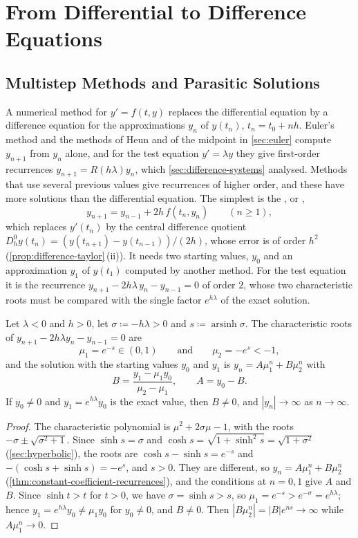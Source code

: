 \section{From Differential to Difference Equations}
\label{sec:ode-to-difference}

\subsection{Multistep Methods and Parasitic Solutions}

A numerical method for $y'=f(t,y)$ replaces the differential equation by a difference equation for the approximations $y_n$ of $y(t_n)$, $t_n=t_0+nh$. Euler's method and the methods of Heun and of the midpoint in \cref{sec:euler} compute $y_{n+1}$ from $y_n$ alone, and for the test equation $y'=\lambda y$ they give first-order recurrences $y_{n+1}=R(h\lambda)y_n$, which \cref{sec:difference-systems} analysed. Methods that use several previous values give recurrences of higher order, and these have more solutions than the differential equation. The simplest is the , or ,
\begin{equation}
y_{n+1}=y_{n-1}+2h\,f(t_n,y_n)\qquad(n\ge1),
\label{eq:leapfrog}
\end{equation}
which replaces $y'(t_n)$ by the central difference quotient $D_h^0y(t_n)=(y(t_{n+1})-y(t_{n-1}))/(2h)$, whose error is of order $h^2$ (\cref{prop:difference-taylor}\,(ii)). It needs two starting values, $y_0$ and an approximation $y_1$ of $y(t_1)$ computed by another method. For the test equation it is the recurrence $y_{n+1}-2h\lambda\,y_n-y_{n-1}=0$ of order $2$, whose two characteristic roots must be compared with the single factor $e^{h\lambda}$ of the exact solution.

\begin{proposition}
\label{prop:leapfrog-roots}
Let $\lambda<0$ and $h>0$, let $\sigma\coloneqq-h\lambda>0$ and $s\coloneqq\operatorname{arsinh}\sigma$. The characteristic roots of $y_{n+1}-2h\lambda y_n-y_{n-1}=0$ are
\[
\mu_1=e^{-s}\in(0,1)\qquad\text{and}\qquad\mu_2=-e^{s}<-1 ,
\]
and the solution with the starting values $y_0$ and $y_1$ is $y_n=A\mu_1^n+B\mu_2^n$ with
\[
B=\frac{y_1-\mu_1y_0}{\mu_2-\mu_1},\qquad A=y_0-B .
\]
If $y_0\ne0$ and $y_1=e^{h\lambda}y_0$ is the exact value, then $B\ne0$, and $|y_n|\to\infty$ as $n\to\infty$.
\end{proposition}

\begin{proof}
The characteristic polynomial is $\mu^2+2\sigma\mu-1$, with the roots $-\sigma\pm\sqrt{\sigma^2+1}$. Since $\sinh s=\sigma$ and $\cosh s=\sqrt{1+\sinh^2s}=\sqrt{1+\sigma^2}$ (\cref{sec:hyperbolic}), the roots are $\cosh s-\sinh s=e^{-s}$ and $-(\cosh s+\sinh s)=-e^s$, and $s>0$. They are different, so $y_n=A\mu_1^n+B\mu_2^n$ (\cref{thm:constant-coefficient-recurrences}), and the conditions at $n=0,1$ give $A$ and $B$. Since $\sinh t>t$ for $t>0$, we have $\sigma=\sinh s>s$, so $\mu_1=e^{-s}>e^{-\sigma}=e^{h\lambda}$; hence $y_1=e^{h\lambda}y_0\ne\mu_1y_0$ for $y_0\ne0$, and $B\ne0$. Then $|B\mu_2^n|=|B|e^{ns}\to\infty$ while $A\mu_1^n\to0$.
\end{proof}

